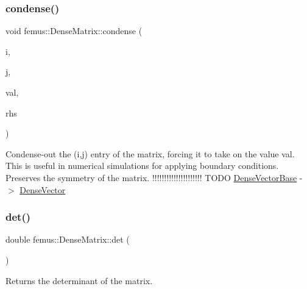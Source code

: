 \mbox{\label{classfemus_1_1_dense_matrix_a2b0e9e0b07db7eb9e3aff9067e2b4fd6}} 
\subsubsection{\texorpdfstring{condense()}{condense()}}
{\footnotesize\ttfamily void femus\+::\+Dense\+Matrix\+::condense (\begin{DoxyParamCaption}\item[{const int}]{i,  }\item[{const int}]{j,  }\item[{const double}]{val,  }\item[{\mbox{\hyperlink{classfemus_1_1_dense_vector_base}{Dense\+Vector\+Base}} \&}]{rhs }\end{DoxyParamCaption})\hspace{0.3cm}{\ttfamily [inline]}}

Condense-\/out the {\ttfamily }(i,j) entry of the matrix, forcing it to take on the value {\ttfamily val}. This is useful in numerical simulations for applying boundary conditions. Preserves the symmetry of the matrix. !!!!!!!!!!!!!!!!!!!!! T\+O\+DO \mbox{\hyperlink{classfemus_1_1_dense_vector_base}{Dense\+Vector\+Base}} -\/$>$ \mbox{\hyperlink{classfemus_1_1_dense_vector}{Dense\+Vector}} \mbox{\label{classfemus_1_1_dense_matrix_a752a0289f98f7182c72b7c08cd49062c}} 
\subsubsection{\texorpdfstring{det()}{det()}}
{\footnotesize\ttfamily double femus\+::\+Dense\+Matrix\+::det (\begin{DoxyParamCaption}{ }\end{DoxyParamCaption})}


\begin{DoxyItemize}
\item \begin{DoxyReturn}{Returns}
the determinant of the matrix. 
\end{DoxyReturn}

\end{DoxyItemize}\mbox{\label{classfemus_1_1_dense_matrix_a3b37181274fbe8eca1523acdecb59bd0}} 
